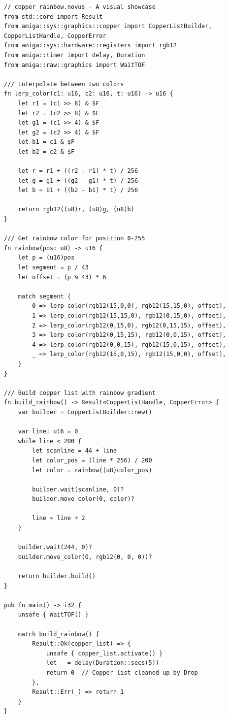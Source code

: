 \begin{lstlisting}
// copper_rainbow.novus - A visual showcase
from std::core import Result
from amiga::sys::graphics::copper import CopperListBuilder, CopperListHandle, CopperError
from amiga::sys::hardware::registers import rgb12
from amiga::timer import delay, Duration
from amiga::raw::graphics import WaitTOF

/// Interpolate between two colors
fn lerp_color(c1: u16, c2: u16, t: u16) -> u16 {
    let r1 = (c1 >> 8) & $F
    let r2 = (c2 >> 8) & $F
    let g1 = (c1 >> 4) & $F
    let g2 = (c2 >> 4) & $F
    let b1 = c1 & $F
    let b2 = c2 & $F

    let r = r1 + ((r2 - r1) * t) / 256
    let g = g1 + ((g2 - g1) * t) / 256
    let b = b1 + ((b2 - b1) * t) / 256

    return rgb12((u8)r, (u8)g, (u8)b)
}

/// Get rainbow color for position 0-255
fn rainbow(pos: u8) -> u16 {
    let p = (u16)pos
    let segment = p / 43
    let offset = (p % 43) * 6

    match segment {
        0 => lerp_color(rgb12(15,0,0), rgb12(15,15,0), offset),
        1 => lerp_color(rgb12(15,15,0), rgb12(0,15,0), offset),
        2 => lerp_color(rgb12(0,15,0), rgb12(0,15,15), offset),
        3 => lerp_color(rgb12(0,15,15), rgb12(0,0,15), offset),
        4 => lerp_color(rgb12(0,0,15), rgb12(15,0,15), offset),
        _ => lerp_color(rgb12(15,0,15), rgb12(15,0,0), offset),
    }
}

/// Build copper list with rainbow gradient
fn build_rainbow() -> Result<CopperListHandle, CopperError> {
    var builder = CopperListBuilder::new()

    var line: u16 = 0
    while line < 200 {
        let scanline = 44 + line
        let color_pos = (line * 256) / 200
        let color = rainbow((u8)color_pos)

        builder.wait(scanline, 0)?
        builder.move_color(0, color)?

        line = line + 2
    }

    builder.wait(244, 0)?
    builder.move_color(0, rgb12(0, 0, 0))?

    return builder.build()
}

pub fn main() -> i32 {
    unsafe { WaitTOF() }

    match build_rainbow() {
        Result::Ok(copper_list) => {
            unsafe { copper_list.activate() }
            let _ = delay(Duration::secs(5))
            return 0  // Copper list cleaned up by Drop
        },
        Result::Err(_) => return 1
    }
}
\end{lstlisting}

